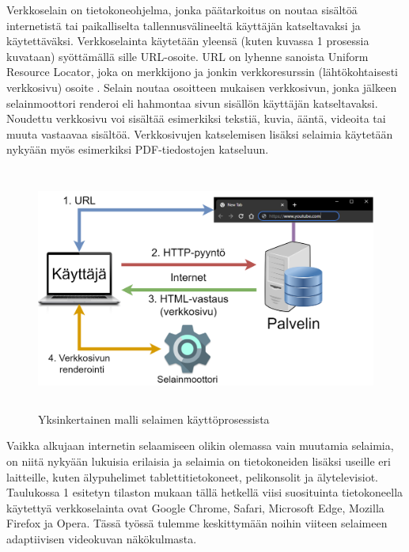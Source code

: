 \documentclass[finnish, 12pt, a4paper, elec, utf8, a-1b, online]{aaltothesis}
\begin{document}
Verkkoselain on tietokoneohjelma, jonka päätarkoitus on noutaa sisältöä internetistä tai paikalliselta tallennusvälineeltä käyttäjän katseltavaksi ja käytettäväksi. Verkkoselainta käytetään yleensä (kuten kuvassa 1 prosessia kuvataan) syöttämällä sille URL-osoite. URL on lyhenne sanoista Uniform Resource Locator, joka on merkkijono ja jonkin verkkoresurssin (lähtökohtaisesti verkkosivu) osoite \cite{URL}. Selain noutaa osoitteen mukaisen verkkosivun, jonka jälkeen selainmoottori renderoi eli hahmontaa sivun sisällön käyttäjän katseltavaksi. Noudettu verkkosivu voi sisältää esimerkiksi tekstiä, kuvia, ääntä, videoita tai muuta vastaavaa sisältöä. Verkkosivujen katselemisen lisäksi selaimia käytetään nykyään myös esimerkiksi PDF-tiedostojen katseluun. \\

\begin{figure}[htb]
  \centering
  \includegraphics[height=8cm]{./img/browser.png}
  \caption{Yksinkertainen malli selaimen käyttöprosessista \label{kuva1}}
\end{figure}

\noindent Vaikka alkujaan internetin selaamiseen olikin olemassa vain muutamia selaimia, on niitä nykyään lukuisia erilaisia ja selaimia on tietokoneiden lisäksi useille eri laitteille, kuten älypuhelimet tablettitietokoneet, pelikonsolit ja älytelevisiot. Taulukossa 1 esitetyn tilaston mukaan tällä hetkellä viisi suosituinta tietokoneella käytettyä verkkoselainta ovat Google Chrome, Safari, Microsoft Edge, Mozilla Firefox ja Opera. Tässä työssä tulemme keskittymään noihin viiteen selaimeen adaptiivisen videokuvan näkökulmasta. \\
\end{document}
